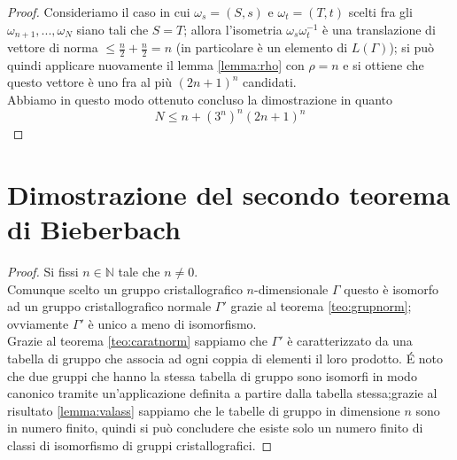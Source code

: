 \documentclass[a4paper,11pt,openright,twoside	]{book}
\begin{document}
\begin{proof}
Consideriamo il caso in cui $\omega_s = (S,s) $ e $\omega_t = (T,t)$ scelti fra gli $\omega_{n+1},...,\omega_N $ siano tali che $S = T$; allora l'isometria $\omega_s \omega_t^{-1}$ è una translazione di vettore di norma $\leq \frac{n}{2} + \frac{n}{2} = n$ (in particolare è un elemento di $L(\Gamma)$);  si può quindi applicare nuovamente il lemma \ref{lemma:rho} con $\rho = n$ e si ottiene che questo vettore è uno fra al più $(2n+1)^n$ candidati. \\
Abbiamo in questo modo ottenuto concluso la dimostrazione in quanto 
\[ N \leq n + (3^n)^n (2n+1)^n\]
\end{proof}
	
\section{Dimostrazione del secondo teorema di Bieberbach}
\begin{proof}
Si fissi $n \in \mathbb{N}$  tale che $n \neq 0$. \\
Comunque scelto un gruppo cristallografico $n$-dimensionale $\Gamma$ questo è isomorfo ad un gruppo cristallografico normale $\Gamma'$ grazie al teorema  \ref{teo:grupnorm}; ovviamente $\Gamma'$ è unico a meno di isomorfismo. \\
Grazie al teorema \ref{teo:caratnorm} sappiamo che $\Gamma'$ è caratterizzato da una tabella di gruppo che associa ad ogni coppia di elementi il loro prodotto. \'E  noto che due gruppi che hanno la stessa tabella di gruppo sono isomorfi in modo canonico tramite un'applicazione definita a partire dalla tabella stessa;grazie al risultato \ref{lemma:valass} sappiamo che le tabelle di gruppo in dimensione $n$ sono in numero finito, quindi si può concludere che esiste solo un numero finito di classi di isomorfismo di gruppi cristallografici. 
\end{proof}
\end{document}
